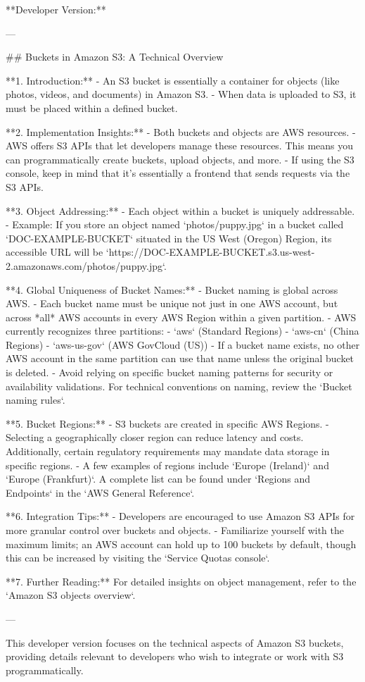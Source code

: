 **Developer Version:**

---

## Buckets in Amazon S3: A Technical Overview

**1. Introduction:**  
- An S3 bucket is essentially a container for objects (like photos, videos, and documents) in Amazon S3.
- When data is uploaded to S3, it must be placed within a defined bucket.
  
**2. Implementation Insights:**  
- Both buckets and objects are AWS resources.
- AWS offers S3 APIs that let developers manage these resources. This means you can programmatically create buckets, upload objects, and more.
- If using the S3 console, keep in mind that it's essentially a frontend that sends requests via the S3 APIs.

**3. Object Addressing:**  
- Each object within a bucket is uniquely addressable.
- Example: If you store an object named `photos/puppy.jpg` in a bucket called `DOC-EXAMPLE-BUCKET` situated in the US West (Oregon) Region, its accessible URL will be `https://DOC-EXAMPLE-BUCKET.s3.us-west-2.amazonaws.com/photos/puppy.jpg`.

**4. Global Uniqueness of Bucket Names:**  
- Bucket naming is global across AWS.
- Each bucket name must be unique not just in one AWS account, but across *all* AWS accounts in every AWS Region within a given partition.
- AWS currently recognizes three partitions:
  - `aws` (Standard Regions)
  - `aws-cn` (China Regions)
  - `aws-us-gov` (AWS GovCloud (US))
- If a bucket name exists, no other AWS account in the same partition can use that name unless the original bucket is deleted.
- Avoid relying on specific bucket naming patterns for security or availability validations. For technical conventions on naming, review the `Bucket naming rules`.

**5. Bucket Regions:**  
- S3 buckets are created in specific AWS Regions.
- Selecting a geographically closer region can reduce latency and costs. Additionally, certain regulatory requirements may mandate data storage in specific regions.
- A few examples of regions include `Europe (Ireland)` and `Europe (Frankfurt)`. A complete list can be found under `Regions and Endpoints` in the `AWS General Reference`.

**6. Integration Tips:**  
- Developers are encouraged to use Amazon S3 APIs for more granular control over buckets and objects.
- Familiarize yourself with the maximum limits; an AWS account can hold up to 100 buckets by default, though this can be increased by visiting the `Service Quotas console`.

**7. Further Reading:**  
For detailed insights on object management, refer to the `Amazon S3 objects overview`.

---

This developer version focuses on the technical aspects of Amazon S3 buckets, providing details relevant to developers who wish to integrate or work with S3 programmatically.